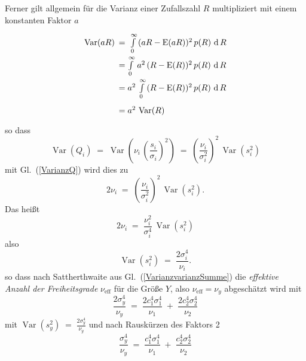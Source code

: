 Ferner gilt allgemein für die Varianz einer Zufallszahl $R$
multipliziert mit einem konstanten Faktor $a$
\begin{equation}
\arraycolsep=2.4pt\def\arraystretch{2}
\begin{array}{ll}
\operatorname{Var}(a R) & = \; \int\limits_0^\infty \, (a R - \operatorname{E}(a R))^2  \, p(R)  \, \operatorname{d}R \\
 & = \int\limits_0^\infty \, a^2 \, (R - \operatorname{E}(R))^2  \, p(R)  \, \operatorname{d}R\\
 & = a^2 \, \int\limits_0^\infty \, (R - \operatorname{E}(R))^2  \, p(R)  \, \operatorname{d}R\\
 & = a^2 \, \operatorname{Var}(R)
\end{array}
\end{equation}
so dass
\begin{equation}
\operatorname{Var}(Q_i) \; = \; \operatorname{Var}\left(\nu_i \, \left(\frac{s_i}{\sigma_i}\right)^2\right)
 \; = \; \left(\frac{\nu_i}{\sigma_i^2}\right)^2 \, \operatorname{Var}(s_i^2)
\end{equation}
mit Gl.~(\ref{VarianzQ}) wird dies zu
\begin{equation}
2 \nu_i \; = \; \left(\frac{\nu_i}{\sigma_i^2}\right)^2 \, \operatorname{Var}(s_i^2) .
\end{equation}
 Das heißt
\begin{equation}
2 \nu_i \; = \; \frac{\nu_i^2}{\sigma_i^4} \, \operatorname{Var}(s_i^2)
\end{equation}
also
\begin{equation}
\operatorname{Var}(s_i^2) \; = \; \frac{2 \sigma_i^4}{\nu_i} .
\end{equation}
so dass nach Sattherthwaite \cite{Sat41} aus Gl.~(\ref{VarianzvarianzSumme}) die \textsl{effektive Anzahl
der Freiheitsgrade} $\nu_\mathrm{eff}$ für die Größe $Y$, also $\nu_\mathrm{eff} = \nu_y$
abgeschätzt wird mit
$$
\frac{2 \sigma_y^4}{\nu_y} \; = \;  \frac{2 c_1^4 \sigma_1^4}{\nu_1}
 \; + \; \frac{2 c_2^4 \sigma_2^4}{\nu_2}
$$
mit $\operatorname{Var}(s_y^2) \; = \; \frac{2 \sigma_y^4}{\nu_y}$
und nach Rauskürzen des Faktors 2
\begin{equation}
\frac{\sigma_y^4}{\nu_y} \; = \;  \frac{c_1^4 \sigma_1^4}{\nu_1}
 \; + \; \frac{c_2^4 \sigma_2^4}{\nu_2}
\label{Satterthwaite}
\end{equation}
